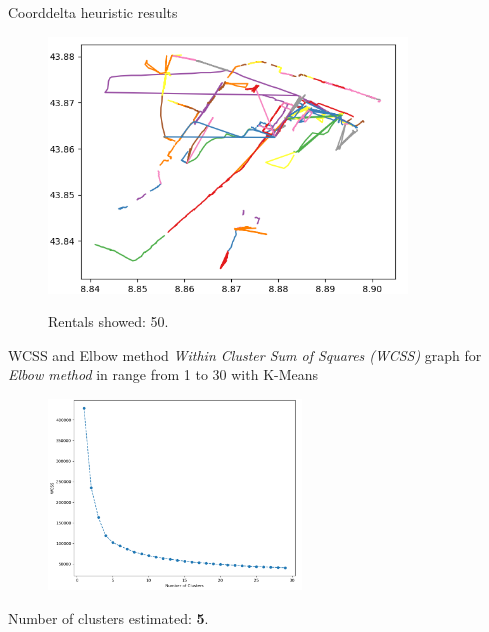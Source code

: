 \documentclass{beamer}
\begin{document}
\begin{frame}{Coorddelta heuristic results}
\begin{figure}[bt]
	\centering
	\includegraphics[width=0.85\textwidth]{coorddelta-result}
	\label{fig:coorddelta-result}
	\caption{Rentals showed: 50.}
\end{figure}
\end{frame}

\begin{frame}{WCSS and Elbow method}
\textit{Within Cluster Sum of Squares (WCSS)} graph for \textit{Elbow method} in range from 1 to 30 with K-Means
\begin{figure}[bt]
	\centering
	\includegraphics[width=0.6\textwidth]{wcss}
	\label{fig:wcss}
\end{figure}
Number of clusters estimated: \textbf{5}.
\end{frame}
\end{document}

